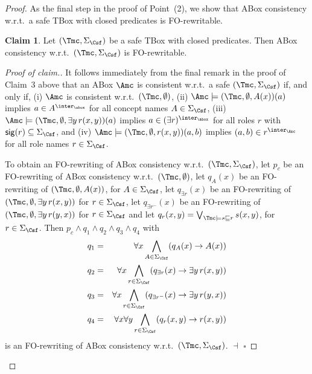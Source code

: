 \documentclass{lmcs}
\theoremstyle{definition}
\newtheorem{claim}{Claim}
\let\OriginalQedSymbol\qedsymbol
\renewcommand{\qedsymbol}{\OriginalQedSymbol\setcounter{claim}{0}}
\let\NormalQedSymbol\qedsymbol
\newenvironment{clmproof}[1]{\renewcommand{\qedsymbol}{$\dashv$}\begin{proof}[Proof of claim.]\space#1}{\end{proof}\renewcommand{\qedsymbol}{\NormalQedSymbol}}
\begin{document}
\begin{proof}
As the final step in the proof of Point~(2), we show that ABox consistency w.r.t.\ a safe \dlliter TBox 
with closed predicates is FO-rewritable. 
\begin{claim}
  Let $(\Tmc,\Sigma_\Csf)$ be a safe \dlliter TBox with closed
  predicates. Then ABox consistency w.r.t.~$(\Tmc,\Sigma_{\Csf})$ is FO-rewritable.
\end{claim}
\begin{clmproof}
  It follows immediately from the final remark in the proof of Claim~3 above
  that an ABox $\Amc$ is consistent w.r.t.~a safe 
  $(\Tmc,\Sigma_\Csf)$ if, and only if, (i) $\Amc$ is consistent w.r.t.\ 
  $(\Tmc,\emptyset)$, (ii) $\Amc\models 
  (\Tmc,\emptyset, A(x))(a)$ implies $a\in 
  A^{\inter_\abox}$ for all concept names $A\in \Sigma_\Csf$, (iii) $\Amc\models 
  (\Tmc,\emptyset, \exists y\, r(x,y))(a)$ implies $a\in 
  (\exists r)^{\inter_\abox}$ for all roles $r$ with ${\sf sig}(r)\subseteq \Sigma_\Csf$,
  and (iv) $\Amc\models 
  (\Tmc,\emptyset,r(x,y))(a,b)$ implies 
  $(a,b)\in r^{\inter_\Amc}$ for all role names $r\in \Sigma_\Csf$. 

  To obtain an FO-rewriting of ABox consistency w.r.t.~$(\Tmc,\Sigma_{\Csf})$, let 
  $p_{c}$ be an FO-rewriting of
  ABox consistency w.r.t.~$(\Tmc,\emptyset)$, let $q_{A}(x)$ be an FO-rewriting of 
  $(\Tmc,\emptyset,A(x))$, for $A\in \Sigma_{\Csf}$,
  let $q_{\exists r}(x)$ be an FO-rewriting of $(\Tmc,\emptyset,\exists y\, r(x,y))$ for $r\in \Sigma_{\Csf}$, 
  let $q_{\exists r^{-}}(x)$ be an FO-rewriting of $(\Tmc,\emptyset,\exists y\, r(y,x))$ for $r\in \Sigma_{\Csf}$ and let
  $q_{r}(x,y)= \bigvee_{\Tmc\models s \sqsubseteq r}s(x,y)$, for $r\in \Sigma_{\Csf}$. 
  Then $p_{c} \wedge q_{1} \wedge q_{2} \wedge q_{3} \wedge q_{4}$
with 
\begin{eqnarray*}
q_{1} & = &\forall x \bigwedge_{A\in \Sigma_{\Csf}}(q_{A}(x)\rightarrow A(x))\\
q_{2} & = &\forall x \bigwedge_{r\in \Sigma_{\Csf}}(q_{\exists r}(x)\rightarrow \exists y \,r(x,y))\\
q_{3} & = &\forall x \bigwedge_{r\in \Sigma_{\Csf}}(q_{\exists r^{-}}(x)\rightarrow \exists y \,r(y,x))\\
q_{4} & = &\forall x\forall y \bigwedge_{r\in \Sigma_{\Csf}}(q_{r}(x,y)\rightarrow r(x,y))
\end{eqnarray*}
is an FO-rewriting of ABox consistency w.r.t.~$(\Tmc,\Sigma_{\Csf})$. \hfill $\dashv$ \hfill
$\square$
\phantom{\qedhere}
\end{clmproof}
\phantom{\qedhere}
\end{proof}
\end{document}
